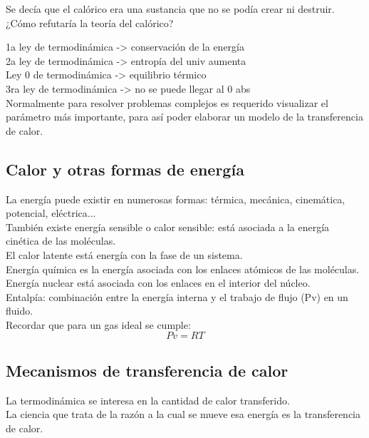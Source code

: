 \documentclass[11pt]{report}
\theoremstyle{plain}
\theoremstyle{definition}
\begin{document}
Se decía que el calórico era una sustancia que no se podía crear ni destruir. ¿Cómo refutaría la teoría del calórico?

1a ley de termodinámica -> conservación de la energía\\
2a ley de termodinámica -> entropía del univ aumenta\\
Ley 0 de termodinámica -> equilibrio térmico\\
3ra ley de termodinámica -> no se puede llegar al 0 abs\\


Normalmente para resolver problemas complejos es requerido visualizar el parámetro más importante, para así poder elaborar un modelo de la transferencia de calor. 

\subsection{Calor y otras formas de energía} %

La energía puede existir en numerosas formas: térmica, mecánica, cinemática, potencial, eléctrica... \\

También existe energía sensible o calor sensible: está asociada a la energía cinética de las moléculas.\\
El calor latente está energía con la fase de un sistema.\\
Energía química es la energía asociada con los enlaces atómicos de las moléculas.\\
Energía nuclear está asociada con los enlaces en el interior del núcleo.\\


Entalpía: combinación entre la energía interna y el trabajo de flujo (Pv) en un fluido.\\

Recordar que para un gas ideal se cumple:
\begin{equation}
	Pv = RT
	\label{eq:gas_ideal}
\end{equation}



\subsection{Mecanismos de transferencia de calor} %
La termodinámica se interesa en la cantidad de calor transferido.\\
La ciencia que trata de la razón a la cual se mueve esa energía es la transferencia de calor.\\
\end{document}
